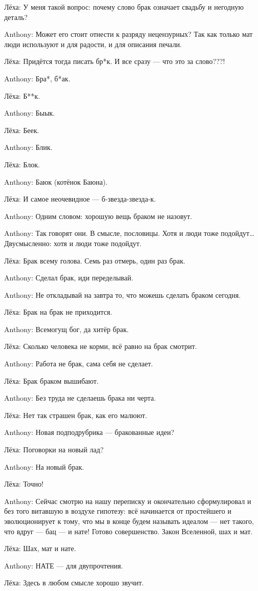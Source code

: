 \begin{miamalist}
  \item[Лёха:] У меня такой вопрос: почему слово брак означает свадьбу и негодную деталь?
  \item[Anthony:] Может его стоит отнести к разряду нецензурных? Так как только мат люди используют и для радости, и для описания печали. %
  \item[Лёха:] Придётся тогда писать бр*к. И все сразу --- что это за слово???!
  \item[Anthony:] Бра*, б*ак.
  \item[Лёха:] Б**к.
  \item[Anthony:] Быык. %
  \item[Лёха:] Беек.
  \item[Anthony:] Блик.
  \item[Лёха:] Блок.
  \item[Anthony:] Баюк (котёнок Баюна).
  \item[Лёха:] И самое неочевидное --- б-звезда-звезда-к.
  \item[Anthony:] Одним словом: хорошую вещь браком не назовут. %
  \item[Anthony:] Так говорят они. В смысле, пословицы. Хотя и люди тоже подойдут\ldots Двусмысленно: хотя и люди тоже подойдут.
  \item[Лёха:] Брак всему голова. Семь раз отмерь, один раз брак.
  \item[Anthony:] Сделал брак, иди переделывай.
  \item[Anthony:] Не откладывай на завтра то, что можешь сделать браком сегодня.
  \item[Лёха:] Брак на брак не приходится.
  \item[Anthony:] Всемогущ бог, да хитёр брак.
  \item[Лёха:] Сколько человека не корми, всё равно на брак смотрит.
  \item[Anthony:] Работа не брак, сама себя не сделает.
  \item[Лёха:] Брак браком вышибают.
  \item[Anthony:] Без труда не сделаешь брака ни черта.
  \item[Лёха:] Нет так страшен брак, как его малюют.
  \item[Anthony:] Новая подподрубрика --- бракованные идеи?
  \item[Лёха:] Поговорки на новый лад?
  \item[Anthony:] На новый брак.
  \item[Лёха:] Точно!
  \item[Anthony:] Сейчас смотрю на нашу переписку и окончательно сформулировал и без того витавшую в воздухе гипотезу: всё начинается от простейшего и эволюционирует к тому, что мы в конце будем называть идеалом --- нет такого, что вдруг --- бац --- и нате! Готово совершенство. Закон Вселенной, шах и мат.
  \item[Лёха:] Шах, мат и нате.
  \item[Anthony:] НАТЕ --- для двупрочтения. %
  \item[Лёха:] Здесь в любом смысле хорошо звучит.
\end{miamalist}

